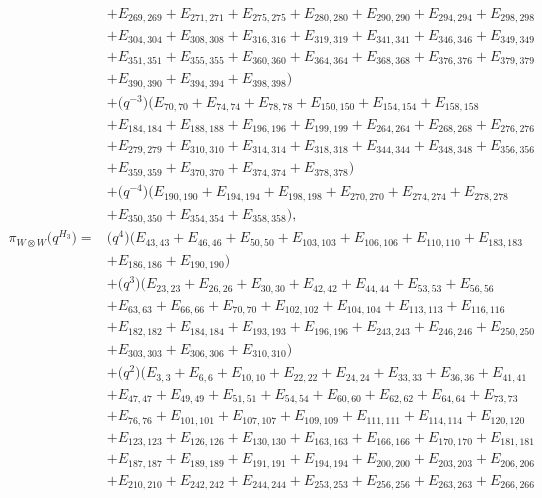 \documentclass[pdftex]{sigma}
\numberwithin{equation}{section}
\theoremstyle{definition}
\begin{document}
\begin{align*}
&+E_{269,269}+E_{271,271}+E_{275,275}+E_{280,280}+E_{290,290}+E_{294,294}+E_{298,298}\\
&+E_{304,304}+E_{308,308}+E_{316,316}+E_{319,319}+E_{341,341}+E_{346,346}+E_{349,349}\\
&+E_{351,351}+E_{355,355}+E_{360,360}+E_{364,364}+E_{368,368}+E_{376,376}+E_{379,379}\\
&+E_{390,390}+E_{394,394}+E_{398,398})\\
&+\bigl(q^{-3}\bigr)(E_{70,70}+E_{74,74}+E_{78,78}+E_{150,150}+E_{154,154}+E_{158,158}\\
&+E_{184,184}+E_{188,188}+E_{196,196}+E_{199,199}+E_{264,264}+E_{268,268}+E_{276,276}\\
&+E_{279,279}+E_{310,310}+E_{314,314}+E_{318,318}+E_{344,344}+E_{348,348}+E_{356,356}\\
&+E_{359,359}+E_{370,370}+E_{374,374}+E_{378,378})\\
&+\bigl(q^{-4}\bigr)(E_{190,190}+E_{194,194}+E_{198,198}+E_{270,270}+E_{274,274}+E_{278,278}\\
&+E_{350,350}+E_{354,354}+E_{358,358}),
\\
 \pi_{W \otimes W}\bigl(q^{H_3}\bigr) ={}&
\bigl(q^4\bigr)(E_{43,43}+E_{46,46}+E_{50,50}+E_{103,103}+E_{106,106}+E_{110,110}+E_{183,183}\\
&+E_{186,186}+E_{190,190})\\
&+\bigl(q^3\bigr)(E_{23,23}+E_{26,26}+E_{30,30}+E_{42,42}+E_{44,44}+E_{53,53}+E_{56,56}\\
&+E_{63,63}+E_{66,66}+E_{70,70}+E_{102,102}+E_{104,104}+E_{113,113}+E_{116,116}\\
&+E_{182,182}+E_{184,184}+E_{193,193}+E_{196,196}+E_{243,243}+E_{246,246}+E_{250,250}\\
&+E_{303,303}+E_{306,306}+E_{310,310})\\
&+\bigl(q^2\bigr)(E_{3,3}+E_{6,6}+E_{10,10}+E_{22,22}+E_{24,24}+E_{33,33}+E_{36,36}+E_{41,41}\\
&+E_{47,47}+E_{49,49}+E_{51,51}+E_{54,54}+E_{60,60}+E_{62,62}+E_{64,64}+E_{73,73}\\
&+E_{76,76}+E_{101,101}+E_{107,107}+E_{109,109}+E_{111,111}+E_{114,114}+E_{120,120}\\
&+E_{123,123}+E_{126,126}+E_{130,130}+E_{163,163}+E_{166,166}+E_{170,170}+E_{181,181}\\
&+E_{187,187}+E_{189,189}+E_{191,191}+E_{194,194}+E_{200,200}+E_{203,203}+E_{206,206}\\
&+E_{210,210}+E_{242,242}+E_{244,244}+E_{253,253}+E_{256,256}+E_{263,263}+E_{266,266}\\

\end{align*}
\end{document}
